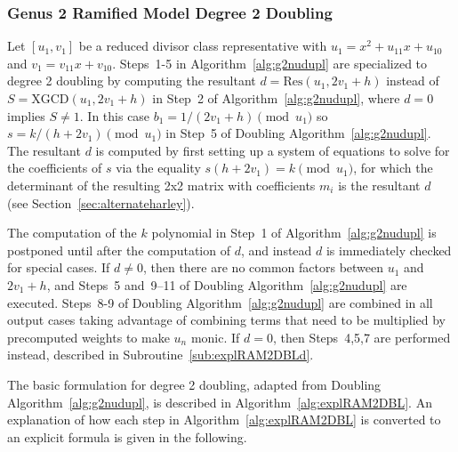 \subsubsection{Genus 2 Ramified Model Degree 2 Doubling}
Let $[u_1,v_1]$ be a reduced divisor class representative with $u_1 = x^2 +
u_{11}x + u_{10}$ and $v_1 = v_{11}x + v_{10}$. Steps~1-5 in
Algorithm~\ref{alg:g2nudupl} are specialized to degree 2 doubling by
computing the resultant $d = \mathrm{Res}(u_1,2v_1+h)$ instead of $S =
\mathrm{XGCD}(u_1,2v_1 + h)$ in Step~2 of Algorithm~\ref{alg:g2nudupl}, where
$d=0$ implies $S \neq 1$. In this case $b_1 = 1/(2v_1 + h) \pmod{u_1}$ so $s
= k/(h + 2v_1) \pmod{u_1}$ in Step~5 of Doubling Algorithm~\ref{alg:g2nudupl}.
The resultant $d$ is computed by first setting up a system of equations to solve
for the coefficients of $s$ via the equality $s(h + 2v_1) = k \pmod{u_1}$, for
which the determinant of the resulting 2x2 matrix with coefficients $m_i$ is the
resultant $d$ (see Section~\ref{sec:alternateharley}).

The computation of the $k$ polynomial in Step~1 of Algorithm~\ref{alg:g2nudupl}
is postponed until after the computation of $d$, and instead $d$ is immediately
checked for special cases. If $d \neq 0$, then there are no common factors
between $u_1$ and $2v_1 + h$, and Steps~5 and~9--11 of Doubling
Algorithm~\ref{alg:g2nudupl} are executed. Steps~8-9 of Doubling
Algorithm~\ref{alg:g2nudupl} are combined in all output cases taking advantage
of combining terms that need to be multiplied by precomputed weights to make
$u_n$ monic. If $d = 0$, then Steps~4,5,7 are performed instead, described in
Subroutine~\ref{sub:explRAM2DBLd}. 

The basic formulation for degree 2 doubling, adapted from Doubling
Algorithm~\ref{alg:g2nudupl}, is described in Algorithm~\ref{alg:explRAM2DBL}.
An explanation of how each step in Algorithm~\ref{alg:explRAM2DBL} is converted
to an explicit formula is given in the following.

